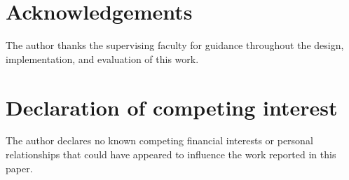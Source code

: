\documentclass[preprint,12pt,3p]{elsarticle}
\begin{document}
\section*{Acknowledgements}
The author thanks the supervising faculty for guidance throughout the design, implementation, and evaluation of this work.

\section*{Declaration of competing interest}
The author declares no known competing financial interests or personal relationships that could have appeared to influence the work reported in this paper.



\end{document}
